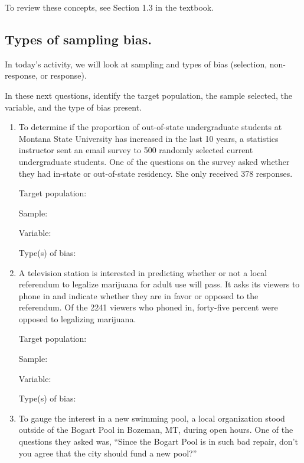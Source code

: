 \documentclass[
]{report}
\begin{document}
To review these concepts, see Section 1.3 in the textbook.

\hypertarget{types-of-sampling-bias.}{%
\subsection*{Types of sampling bias.}\label{types-of-sampling-bias.}}

In today's activity, we will look at sampling and types of bias (selection, non-response, or response).

In these next questions, identify the target population, the sample selected, the variable, and the type of bias present.

\begin{enumerate}
\def\labelenumi{\arabic{enumi}.}
\item
  To determine if the proportion of out-of-state undergraduate students at Montana State University has increased in the last 10 years, a statistics instructor sent an email survey to 500 randomly selected current undergraduate students. One of the questions on the survey asked whether they had in-state or out-of-state residency. She only received 378 responses.
  \vspace{0.25in}

  Target population:
  \vspace{0.3in}

  Sample:
  \vspace{0.3in}

  Variable:
  \vspace{0.3in}

  Type(s) of bias:
  \vspace{0.3in}
\item
  A television station is interested in predicting whether or not a local referendum to legalize marijuana for adult use will pass. It asks its viewers to phone in and indicate whether they are in favor or opposed to the referendum. Of the 2241 viewers who phoned in, forty-five percent were opposed to legalizing marijuana.
  \vspace{0.1in}

  Target population:
  \vspace{0.3in}

  Sample:
  \vspace{0.3in}

  Variable:
  \vspace{0.3in}

  Type(s) of bias:
  \vspace{0.3in}
\item
  To gauge the interest in a new swimming pool, a local organization stood outside of the Bogart Pool in Bozeman, MT, during open hours. One of the questions they asked was, ``Since the Bogart Pool is in such bad repair, don't you agree that the city should fund a new pool?''
  \vspace{0.1in}


\end{enumerate}
\end{document}
